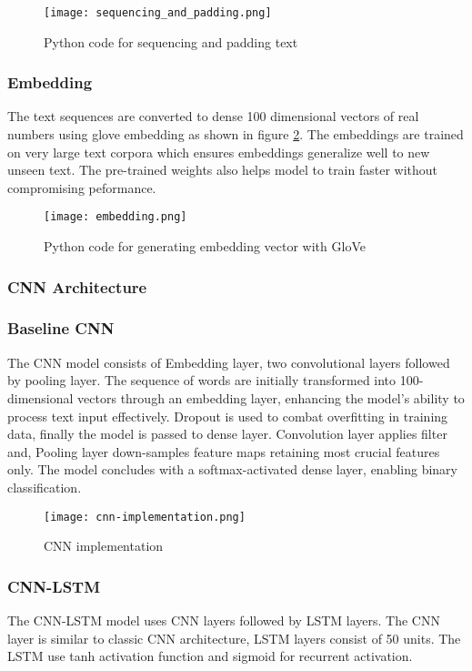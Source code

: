 \begin{figure}[h]
    \centering
    \texttt{[image: sequencing\_and\_padding.png]}
    \caption{Python code for sequencing and padding text}
    \label{fig:sequencing_and_padding}
\end{figure}

\subsubsection{Embedding} The text sequences are converted to dense 100 dimensional vectors of real numbers using \ac{glove} embedding as shown in figure \ref{fig:embedding_with_glove}. The embeddings are trained on very large text corpora which ensures embeddings generalize well to new unseen text. The pre-trained weights also helps model to train faster without compromising peformance.

\begin{figure}[h]
    \centering
    \texttt{[image: embedding.png]}
    \caption{Python code for generating embedding vector with GloVe}
    \label{fig:embedding_with_glove}
\end{figure}

\clearpage
\subsubsection{CNN Architecture}
\subsubsection{Baseline CNN}
The CNN model consists of Embedding layer, two convolutional layers followed by pooling layer. The sequence of words are initially transformed into 100-dimensional vectors through an embedding layer, enhancing the model’s ability to process text input effectively. Dropout is used to combat overfitting in training data, finally the model is passed to dense layer. Convolution layer applies filter and, Pooling layer down-samples feature maps retaining most crucial features only. The model concludes with a softmax-activated dense layer, enabling binary classification.

\begin{figure}[ht]
    \centering
    \texttt{[image: cnn-implementation.png]}
    \caption{CNN implementation}
    \label{fig:cnn_implementation}
\end{figure}

\clearpage

\subsubsection{CNN-LSTM}
The CNN-LSTM model uses CNN layers followed by LSTM layers. The CNN layer is similar to classic CNN architecture, LSTM layers consist of 50 units. The LSTM use tanh activation function and sigmoid for recurrent activation.

